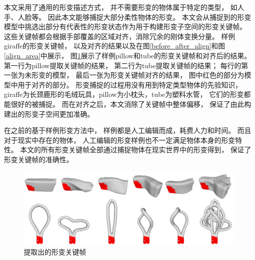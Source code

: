 本文采用了通用的形变描述方式，
并不需要形变的物体属于特定的类型，
如人手、人脸等。
因此本文能够捕捉大部分柔性物体的形变。
本文会从捕捉到的形变模型中挑选出部分有代表性的形变状态作为用于构建形变子空间的形变关键帧。
这些关键帧都会根据手部覆盖的区域对齐，消除冗余的刚体变换分量。
样例giraffe的形变关键帧，
以及对齐的结果以及在图\ref{before_after_align}和图\ref{align_area}中展示，
图\ref{pillow_tube_keyframe}展示了样例pillow和tube的形变关键帧和对齐后的结果。
第一行为pillow提取关键帧的结果，
第二行为tube提取关键帧的结果；
每行的第一张为未形变的模型，
最后一张为形变关键帧对齐的结果，
图中红色的部分为模型中用于对齐的部分。
形变捕捉的过程用没有用到特定类型物体的先验知识，
giraffe为长颈鹿形的毛绒玩具，pillow为小枕头，tube为塑料水管，
它们的形变都能很好的被捕捉。
而在对齐之后，本文消除了关键帧中整体偏移，
保证了由此构建出的形变子空间更加准确。

在之前的基于样例形变方法中，
样例都是人工编辑而成，耗费人力和时间。
而且对于现实中存在的物体，
人工编辑的形变样例也不一定满足物体本身的形变特性。
本文的所有形变关键帧全部通过捕捉物体在现实世界中的形变得到，
保证了形变关键帧的准确性。
\begin{figure}
    \centering
    \includegraphics[width = \textwidth]{./Pictures/pillow_tube_keyframe.png}
    \caption{提取出的形变关键帧}
    \label{pillow_tube_keyframe}
\end{figure}

